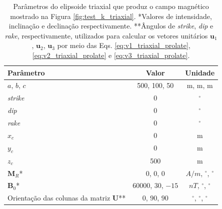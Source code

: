 \newpage

\begin{table}[h!]
	\begin{center}
		\begin{tabular}{|l|c|c|}
			\hline
			\textbf{Parâmetro}  & \textbf{Valor} & \textbf{Unidade} \\
			\hline 
			$a$, $b$, $c$   & 500, 100, 50 & m, m, m\\
			\hline
			\textit{strike}   & $0$ & $^{\circ}$\\
			\hline
			\textit{dip}   & $0$ & $^{\circ}$\\
			\hline
			\textit{rake}   & $0$  & $^{\circ}$\\
			\hline
			$x_c$   & 0  & m\\
			\hline          
			$y_c$   & 0  & m\\
			\hline                
			$z_c$   & 500 & m \\
			\hline
			$\mathbf{M}_{R}$*  & 0, $0$, $0$ & $A/m$, $^{\circ}$, $^{\circ}$ \\
			\hline
			$\mathbf{B}_{0}$*    & 60000, $30$, $-15$ & $nT$, $^{\circ}$, $^{\circ}$ \\
			\hline
			Orientação das colunas da matriz $\mathbf{U}$**  & $0$, $90$, $90$ & $^{\circ}$, $^{\circ}$, $^{\circ}$ \\
			\hline
		\end{tabular}
		\caption{Parâmetros do elipsoide triaxial que produz o campo magnético mostrado na Figura \ref{fig:test_k_triaxial}. *Valores de intensidade, inclinação e declinação respectivamente. **Ângulos de \textit{strike}, \textit{dip}  e \textit{rake}, respectivamente, utilizados para calcular os vetores unitários $\mathbf{u}_{1}$, $\mathbf{u}_{2}$, $\mathbf{u}_{3}$ por meio das Eqs. \ref{eq:v1_triaxial_prolate}, \ref{eq:v2_triaxial_prolate} e \ref{eq:v3_triaxial_prolate}.}
	\end{center}
	\label{tab:triaxial_k_iso}
\end{table}

